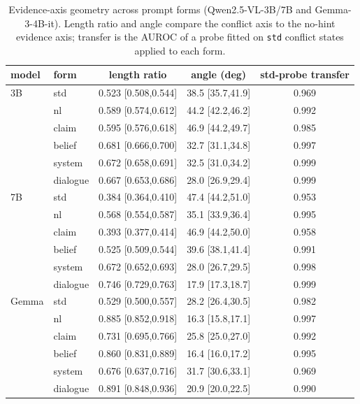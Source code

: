 \documentclass[10pt]{article}
\begin{document}
\begin{table}[h]
\centering
\small
\caption{Evidence-axis geometry across prompt forms (Qwen2.5-VL-3B/7B and
Gemma-3-4B-it). Length ratio and angle compare the conflict axis to the
no-hint evidence axis; transfer is the AUROC of a probe fitted on
\texttt{std} conflict states applied to each form.}
\label{tab:sixform-geometry}
\begin{tabular}{llccc}
\toprule
model & form & length ratio & angle (deg) & std-probe transfer \\
\midrule
3B & std & 0.523 [0.508,0.544] & 38.5 [35.7,41.9] & 0.969 \\
   & nl & 0.589 [0.574,0.612] & 44.2 [42.2,46.2] & 0.992 \\
   & claim & 0.595 [0.576,0.618] & 46.9 [44.2,49.7] & 0.985 \\
   & belief & 0.681 [0.666,0.700] & 32.7 [31.1,34.8] & 0.997 \\
   & system & 0.672 [0.658,0.691] & 32.5 [31.0,34.2] & 0.999 \\
   & dialogue & 0.667 [0.653,0.686] & 28.0 [26.9,29.4] & 0.999 \\
\midrule
7B & std & 0.384 [0.364,0.410] & 47.4 [44.2,51.0] & 0.953 \\
   & nl & 0.568 [0.554,0.587] & 35.1 [33.9,36.4] & 0.995 \\
   & claim & 0.393 [0.377,0.414] & 46.9 [44.2,50.0] & 0.958 \\
   & belief & 0.525 [0.509,0.544] & 39.6 [38.1,41.4] & 0.991 \\
   & system & 0.672 [0.652,0.693] & 28.0 [26.7,29.5] & 0.998 \\
   & dialogue & 0.746 [0.729,0.763] & 17.9 [17.3,18.7] & 0.999 \\
\midrule
Gemma & std & 0.529 [0.500,0.557] & 28.2 [26.4,30.5] & 0.982 \\
   & nl & 0.885 [0.852,0.918] & 16.3 [15.8,17.1] & 0.997 \\
   & claim & 0.731 [0.695,0.766] & 25.8 [25.0,27.0] & 0.992 \\
   & belief & 0.860 [0.831,0.889] & 16.4 [16.0,17.2] & 0.995 \\
   & system & 0.676 [0.637,0.716] & 31.7 [30.6,33.1] & 0.969 \\
   & dialogue & 0.891 [0.848,0.936] & 20.9 [20.0,22.5] & 0.990 \\
\bottomrule
\end{tabular}
\end{table}
\end{document}
